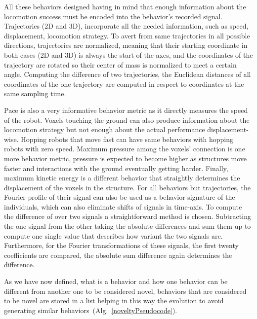 All these behaviors designed having in mind that enough information about the locomotion success must be encoded into the behavior's recorded signal. Trajectories (2D and 3D), incorporate all the needed information, such as speed, displacement, locomotion strategy. To avert from same trajectories in all possible directions, trajectories are normalized, meaning that their starting coordinate in both cases (2D and 3D) is always the start of the axes, and the  coordinates of the trajectory are rotated so their center of mass is normalized to meet a certain angle. Computing the difference of two trajectories, the Euclidean distances of all coordinates of the one trajectory are computed in respect to coordinates at the same sampling time.

Pace is also a very informative behavior metric as it directly measures the speed of the robot. Voxels touching the ground can also produce information about the locomotion strategy but not enough about the actual performance displacement-wise. Hopping robots that move fast can have same behaviors with hopping robots with zero speed. Maximum pressure among the voxels' connection is one more behavior metric, pressure is expected to become higher as structures move faster and interactions with the ground eventually getting harder. Finally, maximum kinetic energy is a different behavior that straightly determines the displacement of the voxels in the structure. For all behaviors but trajectories, the Fourier profile of their signal can also be used as a behavior signature of the individuals, which can also eliminate shifts of signals in time-axis. To compute the difference of over two signals a straightforward method is chosen. Subtracting the one signal from the other taking the absolute differences and sum them up to compute one single value that describes how variant the two signals are. Furthermore, for the Fourier transformations of these signals, the first twenty coefficients are compared, the absolute sum difference again determines the difference.

As we have now defined, what is a behavior and how one behavior can be different from another one to be considered novel, behaviors that are considered to be novel are stored in a list helping in this way the evolution to avoid generating similar behaviors~(Alg.~\ref{noveltyPseudocode}).